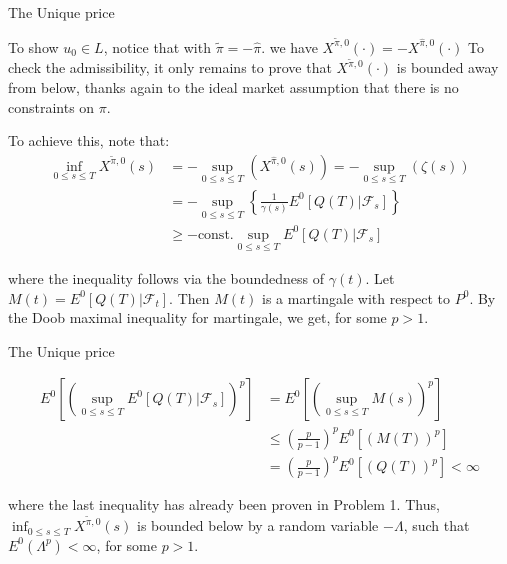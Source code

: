 \documentclass{beamer}
\begin{document}
\begin{frame}{The Unique price}

    {\footnotesize \footnotesize
    \par To show \( u_0 \in L \), notice that with $\tilde{\pi} = -\hat{\pi}$. we have $X^{\tilde{\pi},0}(\cdot) = -X^{\hat{\pi},0}(\cdot)$
    To check the admissibility, it only remains to prove that \( X^{\tilde{\pi},0}(\cdot) \) is bounded 
    away from below, thanks again to the ideal market assumption that there is no constraints on \(\pi\). 
    \par  \pause To achieve this, note that:
    \begin{align*}
        \inf_{0 \leq s \leq T} X^{\tilde{\pi},0}(s) &= -\sup_{0 \leq s \leq T} (X^{\hat{\pi},0}(s)) = -\sup_{0 \leq s \leq T} (\zeta(s)) \\
    &= -\sup_{0 \leq s \leq T} \left\{ \frac{1}{\gamma(s)} E^0[Q(T) | \mathcal{F}_s] \right\} \\
    &\geq -\text{const.} \sup_{0 \leq s \leq T} E^0[Q(T) | \mathcal{F}_s]
    \end{align*}
    \par  \pause where the inequality follows via the boundedness of \(\gamma(t)\). Let $M(t) = E^0[Q(T) | \mathcal{F}_t].$ Then \( M(t) \) is
     a martingale with respect to \( P^0 \). By the Doob maximal inequality for martingale, we get, for some \( p > 1 \).
    }

\end{frame}
\begin{frame}{The Unique price}

    {\footnotesize \footnotesize
    \begin{align*}
E^0 \left[ \left( \sup_{0 \leq s \leq T} E^0[Q(T) | \mathcal{F}_s] \right)^p \right] &=
E^0 \left[ \left( \sup_{0 \leq s \leq T} M(s) \right)^p \right] \\
&\leq \left( \frac{p}{p-1} \right)^p E^0[(M(T))^p] \\
&= \left( \frac{p}{p-1} \right)^p E^0[(Q(T))^p] < \infty
\end{align*}

\par  \pause where the last inequality has already been proven in Problem 1. Thus, \(\inf_{0 \leq s \leq T} X^{\tilde{\pi},0}(s)\) is 
bounded below by a random variable \(-\Lambda\), such that \( E^0(\Lambda^p) < \infty \), for some \( p > 1 \).
    }

\end{frame}
\end{document}
